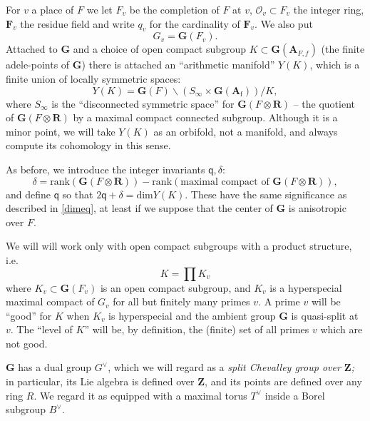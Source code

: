 \documentclass[10pt]{amsart}
\newcommand{\Z}{\mathbf{Z}}
\newcommand{\Afinite}{\mathbf{A}_{\mathrm{f}}}
\renewcommand{\dim}{\mathrm{dim}}
\newcommand{\adele}{\mathbf{A}}
\newcommand{\R}{\mathbf{R}}
\newcommand{\G}{\mathbf{G}}
\theoremstyle{remark}
\newcommand{\BWq}{\mathsf{q}}
\begin{document}
     For $v$ a place of $F$ we let $F_v$ be the completion of $F$ at $v$, $\mathcal{O}_v \subset F_v$ the integer ring, 
  $\mathbf{F}_v$ the residue field and write  $q_v$ for  the cardinality of $\mathbf{F}_v$.  
  We also put  $$G_v = \G(F_v). $$  
   Attached to $\mathbf{G}$ and a choice of open compact subgroup $K \subset \mathbf{G}(\adele_{F, f})$
     (the finite adele-points of $\mathbf{G}$) there is attached an ``arithmetic manifold'' $Y(K)$, which is a finite union of locally symmetric spaces:  
\begin{equation} \label{YKdef} Y(K) =  \G(F) \backslash ( S_{\infty} \times \G(\Afinite))/K,\end{equation} 
where $S_{\infty}$ is the  ``disconnected symmetric space'' for $\G(F \otimes \R)$ -- the quotient of $\G(F \otimes \R)$ by a maximal compact connected subgroup. 
Although it is a minor point, we will take $Y(K)$ as an orbifold, not a manifold, and always compute its cohomology in this sense. 

As before, we introduce the integer invariants $\BWq, \delta$: 
\begin{equation} \label{qdef} \delta = \mathrm{rank}(\mathbf{G}(F \otimes \R)) - \mathrm{rank}(\mbox{maximal compact of $\mathbf{G}(F \otimes \R)$}),\end{equation}
and define $\BWq$ so that $2 \BWq+\delta = \dim Y(K)$. These have   the same significance as described in \eqref{dimeq},
at least if we suppose that the center of $\mathbf{G}$ is anisotropic over $F$.

We  will  will work only with open compact subgroups  with a product structure, i.e. 
\begin{equation} \label{prodformula} K = \prod K_v \end{equation} where
$K_v \subset \G(F_v)$ is an open compact subgroup, and $K_v$ is a hyperspecial maximal compact of $G_v$ 
for all but finitely many primes $v$.   A prime $v$ will be ``good'' for $K$ when $K_v$ is hyperspecial
and the ambient group $\G$ is quasi-split at $v$. 
The ``level of $K$'' will be, by definition, the (finite) set of all primes  $v$  which are not good.   

     
     $\mathbf{G}$ has a dual group $G^{\vee}$, which we will regard as a {\em split Chevalley group over $\Z$;} in particular, its Lie algebra is defined over $\Z$,
     and its points are defined over any ring $R$.   We regard it as equipped with a maximal torus $T^{\vee}$ inside a Borel subgroup $B^{\vee}$.
       
     
\end{document}
